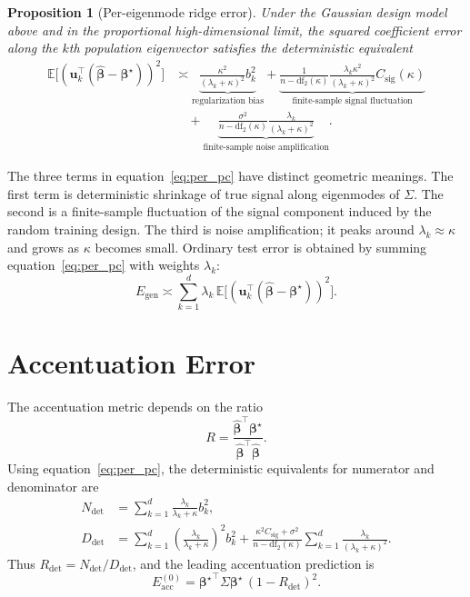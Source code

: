 \documentclass{article}
\newtheorem{proposition}{Proposition}
\newcommand{\bhat}{\widehat{\boldsymbol{\beta}}}
\newcommand{\btrue}{\boldsymbol{\beta}^{\star}}
\newcommand{\uhat}{\mathbf{u}}
\newcommand{\df}{\mathrm{df}_{2}}
\newcommand{\Eacc}{E_{\mathrm{acc}}}
\begin{document}
\begin{proposition}[Per-eigenmode ridge error]
Under the Gaussian design model above and in the proportional high-dimensional limit, the squared coefficient error along the $k$th population eigenvector satisfies the deterministic equivalent
\begin{align}
    \mathbb{E}\bigl[(\uhat_k^\top(\bhat-\btrue))^2\bigr]
    &\asymp
    \underbrace{\frac{\kappa^2}{(\lambda_k+\kappa)^2}b_k^2}_{\text{regularization bias}}
    +
    \underbrace{
    \frac{1}{n-\df(\kappa)}
    \frac{\lambda_k\kappa^2}{(\lambda_k+\kappa)^2}
    C_{\mathrm{sig}}(\kappa)}_{\text{finite-sample signal fluctuation}}
    \nonumber\\
    &\quad+
    \underbrace{
    \frac{\sigma^2}{n-\df(\kappa)}
    \frac{\lambda_k}{(\lambda_k+\kappa)^2}}_{\text{finite-sample noise amplification}} .
    \label{eq:per_pc}
\end{align}
\end{proposition}

The three terms in equation~\ref{eq:per_pc} have distinct geometric meanings. The first term is deterministic shrinkage of true signal along eigenmodes of $\Sigma$. The second is a finite-sample fluctuation of the signal component induced by the random training design. The third is noise amplification; it peaks around $\lambda_k\approx\kappa$ and grows as $\kappa$ becomes small. Ordinary test error is obtained by summing equation~\ref{eq:per_pc} with weights $\lambda_k$:
\begin{equation}
    E_{\mathrm{gen}}\asymp
    \sum_{k=1}^{d}\lambda_k\,
    \mathbb{E}\bigl[(\uhat_k^\top(\bhat-\btrue))^2\bigr].
\end{equation}

\section{Accentuation Error}

The accentuation metric depends on the ratio
\begin{equation}
    R=\frac{\bhat^\top\btrue}{\bhat^\top\bhat}.
\end{equation}
Using equation~\ref{eq:per_pc}, the deterministic equivalents for numerator and denominator are
\begin{align}
    N_{\det}
    &= \sum_{k=1}^{d}\frac{\lambda_k}{\lambda_k+\kappa}b_k^2,\\
    D_{\det}
    &= \sum_{k=1}^{d}\left(\frac{\lambda_k}{\lambda_k+\kappa}\right)^2b_k^2
    +
    \frac{\kappa^2 C_{\mathrm{sig}}+\sigma^2}{n-\df(\kappa)}
    \sum_{k=1}^{d}\frac{\lambda_k}{(\lambda_k+\kappa)^2}.
\end{align}
Thus $R_{\det}=N_{\det}/D_{\det}$, and the leading accentuation prediction is
\begin{equation}
    \Eacc^{(0)}
    =
    {\btrue}^{\top}\Sigma\btrue\,(1-R_{\det})^2.
    \label{eq:eacc0}
\end{equation}
\end{document}

